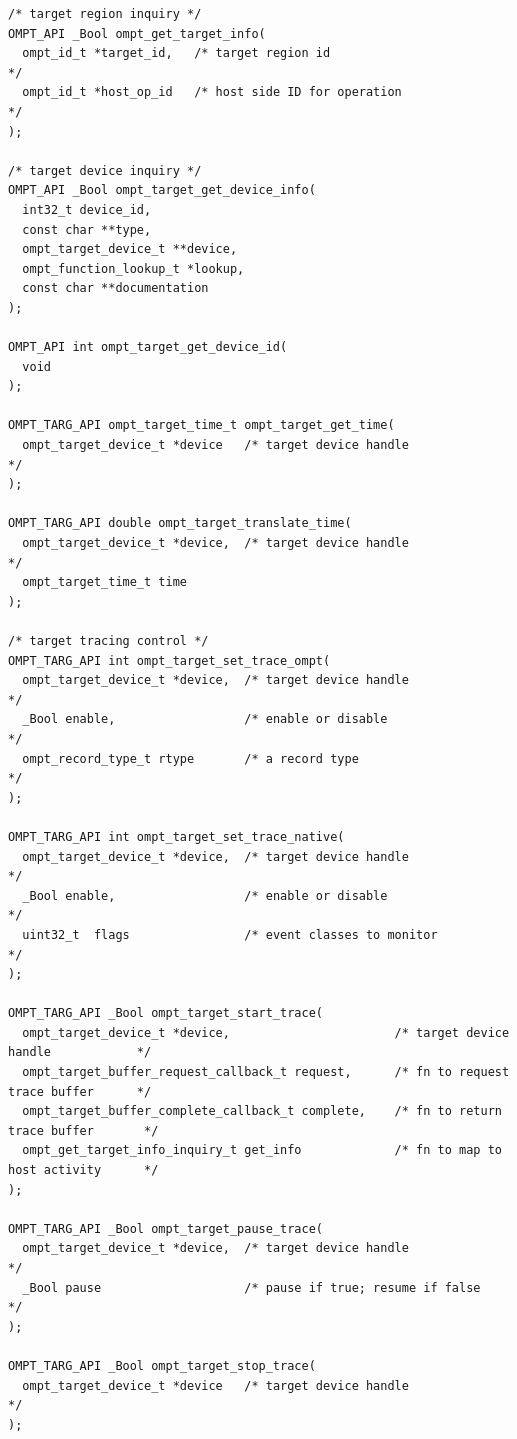 \documentclass{article}
\begin{document}
\begin{verbatim}
/* target region inquiry */
OMPT_API _Bool ompt_get_target_info(
  ompt_id_t *target_id,   /* target region id                                     */
  ompt_id_t *host_op_id   /* host side ID for operation                           */
);

/* target device inquiry */
OMPT_API _Bool ompt_target_get_device_info(
  int32_t device_id, 
  const char **type, 
  ompt_target_device_t **device,
  ompt_function_lookup_t *lookup,
  const char **documentation
);

OMPT_API int ompt_target_get_device_id(
  void
);

OMPT_TARG_API ompt_target_time_t ompt_target_get_time( 
  ompt_target_device_t *device   /* target device handle                                 */
);

OMPT_TARG_API double ompt_target_translate_time(
  ompt_target_device_t *device,  /* target device handle                                 */
  ompt_target_time_t time
);

/* target tracing control */
OMPT_TARG_API int ompt_target_set_trace_ompt(
  ompt_target_device_t *device,  /* target device handle                                 */
  _Bool enable,                  /* enable or disable                                    */
  ompt_record_type_t rtype       /* a record type                                        */
);

OMPT_TARG_API int ompt_target_set_trace_native(
  ompt_target_device_t *device,  /* target device handle                                 */
  _Bool enable,                  /* enable or disable                                    */
  uint32_t  flags                /* event classes to monitor                             */
);

OMPT_TARG_API _Bool ompt_target_start_trace(
  ompt_target_device_t *device,                       /* target device handle            */
  ompt_target_buffer_request_callback_t request,      /* fn to request trace buffer      */
  ompt_target_buffer_complete_callback_t complete,    /* fn to return trace buffer       */
  ompt_get_target_info_inquiry_t get_info             /* fn to map to host activity      */
);

OMPT_TARG_API _Bool ompt_target_pause_trace(
  ompt_target_device_t *device,  /* target device handle                                 */
  _Bool pause                    /* pause if true; resume if false                       */
);

OMPT_TARG_API _Bool ompt_target_stop_trace(
  ompt_target_device_t *device   /* target device handle                                 */
);


\end{verbatim}
\end{document}
